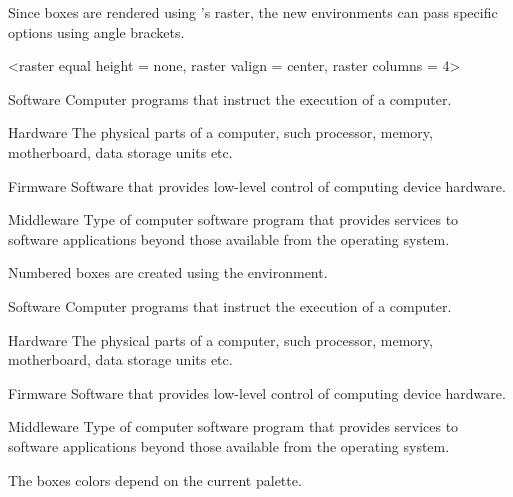 \documentclass[a4paper, 11pt]{article}
\begin{document}
Since boxes are rendered using 's raster, the new environments can pass specific options using angle brackets.

\begin{example}{}
    \begin{PLTBoxRaster}
        <raster equal height = none, raster valign = center, raster columns = 4>
        \item[Software] Computer programs that instruct the execution of a computer.
        \item[Hardware] The physical parts of a computer, such processor, memory, motherboard, data storage units etc.
        \item[Firmware] Software that provides low-level control of computing device hardware.
        \item[Middleware] Type of computer software program that provides services to software applications beyond those available from the operating system.
    \end{PLTBoxRaster}
\end{example}

Numbered boxes are created using the  environment.

\begin{example}{}
    \begin{PLTBoxRaster}[enumerate]
        \item[Software] Computer programs that instruct the execution of a computer.
        \item[Hardware] The physical parts of a computer, such processor, memory, motherboard, data storage units etc.
        \item[Firmware] Software that provides low-level control of computing device hardware.
        \item[Middleware] Type of computer software program that provides services to software applications beyond those available from the operating system.
    \end{PLTBoxRaster}
\end{example}

The boxes colors depend on the current palette.
\end{document}
